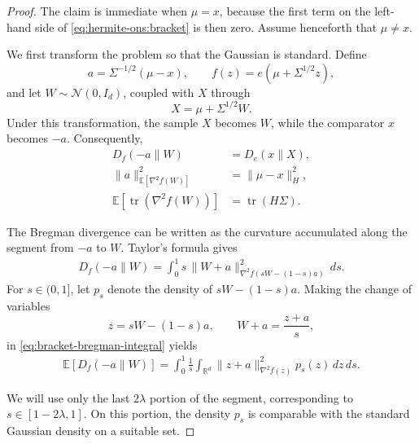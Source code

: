 \documentclass{article}
\theoremstyle{plain}
\theoremstyle{definition}
\theoremstyle{plain}
\newcommand{\R}{\mathbb R}
\newcommand{\tr}{\operatorname{tr}}
\newcommand{\E}{\mathbb E}
\newcommand{\cN}{\mathcal N}
\begin{document}
\begin{proof}
    The claim is immediate when $\mu=x$, because the first term on the
    left-hand side of \eqref{eq:hermite-ons:bracket} is then zero.
    Assume henceforth that $\mu\neq x$.

    We first transform the problem so that the Gaussian is standard.
    Define
    \[
        a=\Sigma^{-1/2}(\mu-x),
        \qquad
        f(z)=e(\mu+\Sigma^{1/2}z),
    \]
    and let $W\sim\cN(0,I_d)$, coupled with $X$ through
    \[
        X=\mu+\Sigma^{1/2}W.
    \]
    Under this transformation, the sample $X$ becomes $W$, while the
    comparator $x$ becomes $-a$. Consequently,
    \begin{align}
        D_f(-a\|W)
         & =D_e(x\|X),
        \label{eq:bracket-whitening-bregman}
        \\
        \|a\|_{\E[\nabla^2f(W)]}^2
         & =\|\mu-x\|_H^2,
        \label{eq:bracket-whitening-focus}
        \\
        \E[\tr(\nabla^2f(W))]
         & =\tr(H\Sigma).
        \label{eq:bracket-whitening-trace}
    \end{align}

    The Bregman divergence can be written as the curvature accumulated
    along the segment from $-a$ to $W$. Taylor's formula gives
    \begin{align}
        D_f(-a\|W)
        =
        \int_0^1
        s\,
        \|W+a\|_{\nabla^2f(sW-(1-s)a)}^2
        \,ds.
        \label{eq:bracket-bregman-integral}
    \end{align}
    For $s\in(0,1]$, let $p_s$ denote the density of
    $sW-(1-s)a$. Making the change of variables
    \[
        z=sW-(1-s)a,
        \qquad
        W+a=\frac{z+a}{s},
    \]
    in \eqref{eq:bracket-bregman-integral} yields
    \begin{align}
        \E[D_f(-a\|W)]
        =
        \int_0^1\frac{1}{s}
        \int_{\R^d}
        \|z+a\|_{\nabla^2f(z)}^2
        p_s(z)\,dz\,ds.
        \label{eq:bracket-density-integral}
    \end{align}

    We will use only the last $2\lambda$ portion of the segment,
    corresponding to $s\in[1-2\lambda,1]$. On this portion, the
    density $p_s$ is comparable with the standard Gaussian density on
    a suitable set.


\end{proof}
\end{document}
